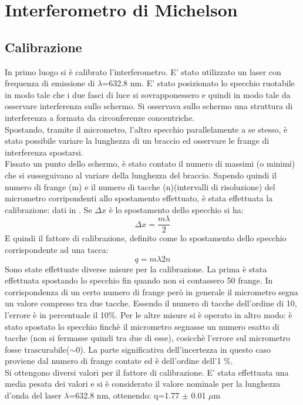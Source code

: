 \section{Interferometro di Michelson}
\subsection{Calibrazione}
In primo luogo si è calibrato l'interferometro. E' stato utilizzato un laser con frequenza di emissione di $\lambda$=632.8 nm. 
E' stato posizionato lo specchio ruotabile in modo tale che i due fasci di luce si sovrapponessero e quindi in modo tale da osservare interferenza sullo schermo.
Si osservava sullo schermo una struttura di interferenza a formata da circonferenze concentriche. \\
Spostando, tramite il micrometro, l'altro specchio parallelamente a se stesso, è stato possibile variare la lunghezza di un braccio ed osservare le frange di interferenza spostarsi.\\
Fissato un punto dello schermo, è stato contato il numero di massimi (o minimi) che si susseguivano al variare della lunghezza del braccio. Sapendo quindi il numero di frange (m) e il numero di tacche (n)(intervalli di risoluzione) del micrometro corripondenti allo spostamento effettuato, è stata effettuata la calibrazione: dati in . Se $\Delta x$ è lo spostamento dello specchio si ha:
\begin{equation}
\Delta x = \frac{m\lambda}{2}
\end{equation}
E quindi il fattore di calibrazione, definito come lo spostamento dello specchio corrispondente ad una tacca:
\begin{equation}
q={m\lambda}{2n}
\end{equation}
Sono state effettuate diverse misure per la calibrazione. La prima è stata effettuata spostando lo specchio fin quando non si contassero 50 frange. In corrispondenza di un certo numero di frange però in generale il micrometro segna un valore compreso tra due tacche. Essendo il numero di tacche dell'ordine di 10, l'errore è in percentuale il 10\%. Per le altre misure si è operato in altro modo: è stato spostato lo specchio finchè il micrometro segnasse un numero esatto di tacche (non si fermasse quindi tra due di esse), cosicchè l'errore sul micrometro fosse trascurabile($\sim$0). La parte significativa dell'incertezza in questo caso proviene dal numero di frange contate ed è dell'ordine dell'1 \%.\\
Si ottengono diversi valori per il fattore di calibrazione.
E' stata effettuata una media pesata dei valori e si è considerato il valore nominale per la lunghezza d'onda del laser $\lambda$=632.8 nm, ottenendo: q=1.77 $\pm$ 0.01 $\mu$m

